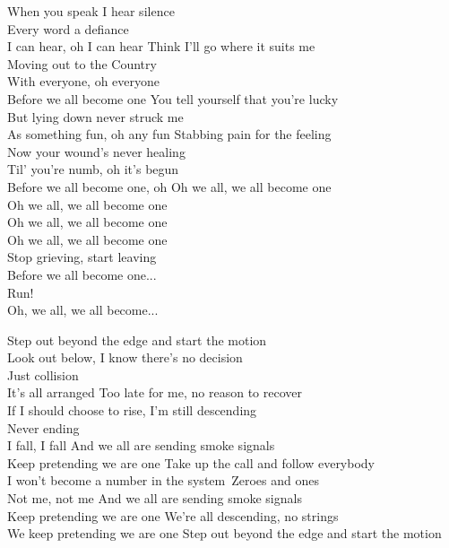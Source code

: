 \clearpage
{}

When you speak I hear silence\\
Every word a defiance\\
I can hear, oh I can hear
\hops
Think I'll go where it suits me\\
Moving out to the Country\\
With everyone, oh everyone\\
Before we all become one
\hops
You tell yourself that you're lucky\\
But lying down never struck me\\
As something fun, oh any fun
\hops
Stabbing pain for the feeling\\
Now your wound's never healing\\
Til' you're numb, oh it's begun\\
Before we all become one, oh
\hops
Oh we all, we all become one\\
Oh we all, we all become one\\
Oh we all, we all become one\\
Oh we all, we all become one\\
\hops
Stop grieving, start leaving\\
Before we all become one...\\
Run!\\
Oh, we all, we all become...

\clearpage
{}

Step out beyond the edge and start the motion\\
Look out below, I know there's no decision\\
Just collision\\
It's all arranged
\hops
Too late for me, no reason to recover\\
If I should choose to rise, I'm still descending\\
Never ending\\
I fall, I fall
\hops
And we all are sending smoke signals\\
Keep pretending we are one
\hops
Take up the call and follow everybody\\
I won't become a number in the system\
Zeroes and ones\\
Not me, not me
\hops
And we all are sending smoke signals\\
Keep pretending we are one
\hops
We're all descending, no strings\\
We keep pretending we are one
\hops
Step out beyond the edge and start the motion

